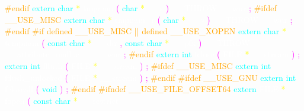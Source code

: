 \textcolor{orange}{\#endif} 
\textcolor{cyan}{extern} 
\textcolor{cyan}{char} 
\textcolor{yellow}{*} 
\textcolor{white}{tmpnam} 
\textcolor{magenta}{(} 
\textcolor{cyan}{char} 
\textcolor{yellow}{*} 
\textcolor{white}{\_\_s} 
\textcolor{magenta}{)} 
\textcolor{white}{\_\_THROW} 
\textcolor{white}{\_\_wur} 
\textcolor{magenta}{;} 
\textcolor{orange}{\#ifdef \_\_USE\_MISC} 
\textcolor{cyan}{extern} 
\textcolor{cyan}{char} 
\textcolor{yellow}{*} 
\textcolor{white}{tmpnam\_r} 
\textcolor{magenta}{(} 
\textcolor{cyan}{char} 
\textcolor{yellow}{*} 
\textcolor{white}{\_\_s} 
\textcolor{magenta}{)} 
\textcolor{white}{\_\_THROW} 
\textcolor{white}{\_\_wur} 
\textcolor{magenta}{;} 
\textcolor{orange}{\#endif} 
\textcolor{orange}{\#if defined \_\_USE\_MISC || defined \_\_USE\_XOPEN} 
\textcolor{cyan}{extern} 
\textcolor{cyan}{char} 
\textcolor{yellow}{*} 
\textcolor{white}{tempnam} 
\textcolor{magenta}{(} 
\textcolor{cyan}{const} 
\textcolor{cyan}{char} 
\textcolor{yellow}{*} 
\textcolor{white}{\_\_dir} 
\textcolor{magenta}{,} 
\textcolor{cyan}{const} 
\textcolor{cyan}{char} 
\textcolor{yellow}{*} 
\textcolor{white}{\_\_pfx} 
\textcolor{magenta}{)} 
\textcolor{white}{\_\_THROW} 
\textcolor{white}{\_\_attribute\_malloc\_\_} 
\textcolor{white}{\_\_wur} 
\textcolor{magenta}{;} 
\textcolor{orange}{\#endif} 
\textcolor{cyan}{extern} 
\textcolor{cyan}{int} 
\textcolor{white}{fclose} 
\textcolor{magenta}{(} 
\textcolor{white}{FILE} 
\textcolor{yellow}{*} 
\textcolor{white}{\_\_stream} 
\textcolor{magenta}{)} 
\textcolor{magenta}{;} 
\textcolor{cyan}{extern} 
\textcolor{cyan}{int} 
\textcolor{white}{fflush} 
\textcolor{magenta}{(} 
\textcolor{white}{FILE} 
\textcolor{yellow}{*} 
\textcolor{white}{\_\_stream} 
\textcolor{magenta}{)} 
\textcolor{magenta}{;} 
\textcolor{orange}{\#ifdef \_\_USE\_MISC} 
\textcolor{cyan}{extern} 
\textcolor{cyan}{int} 
\textcolor{white}{fflush\_unlocked} 
\textcolor{magenta}{(} 
\textcolor{white}{FILE} 
\textcolor{yellow}{*} 
\textcolor{white}{\_\_stream} 
\textcolor{magenta}{)} 
\textcolor{magenta}{;} 
\textcolor{orange}{\#endif} 
\textcolor{orange}{\#ifdef \_\_USE\_GNU} 
\textcolor{cyan}{extern} 
\textcolor{cyan}{int} 
\textcolor{white}{fcloseall} 
\textcolor{magenta}{(} 
\textcolor{cyan}{void} 
\textcolor{magenta}{)} 
\textcolor{magenta}{;} 
\textcolor{orange}{\#endif} 
\textcolor{orange}{\#ifndef \_\_USE\_FILE\_OFFSET64} 
\textcolor{cyan}{extern} 
\textcolor{white}{FILE} 
\textcolor{yellow}{*} 
\textcolor{white}{fopen} 
\textcolor{magenta}{(} 
\textcolor{cyan}{const} 
\textcolor{cyan}{char} 
\textcolor{yellow}{*} 
\textcolor{white}{\_\_restrict} 
